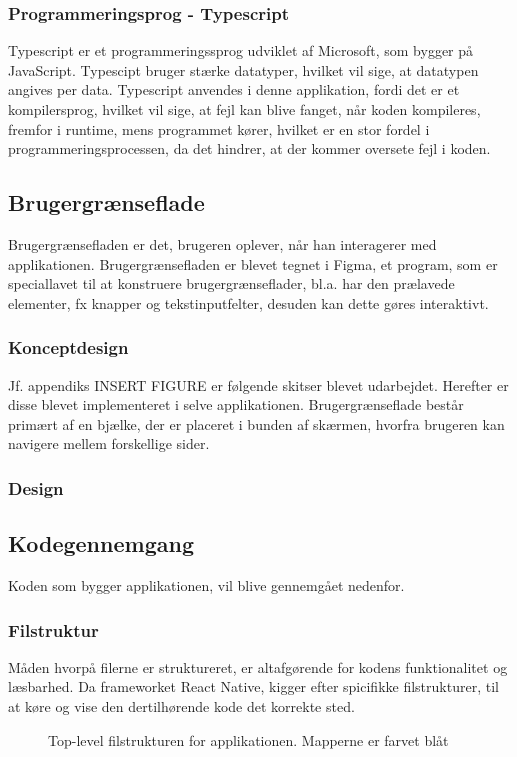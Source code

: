 \subsubsection{Programmeringsprog - Typescript}
Typescript er et programmeringssprog udviklet af Microsoft, som bygger på JavaScript. Typescipt bruger stærke datatyper, hvilket vil sige, at datatypen angives per data. Typescript anvendes i denne applikation, fordi det er et kompilersprog, hvilket vil sige, at fejl kan blive fanget, når koden kompileres, fremfor i runtime, mens programmet kører, hvilket er en stor fordel i programmeringsprocessen, da det hindrer, at der kommer oversete fejl i koden.
\subsection{Brugergrænseflade}
Brugergrænsefladen er det, brugeren oplever, når han interagerer med applikationen. Brugergrænsefladen er blevet tegnet i Figma, et program, som er speciallavet til at konstruere brugergrænseflader, bl.a. har den prælavede elementer, fx knapper og tekstinputfelter, desuden kan dette gøres interaktivt. 
\subsubsection{Konceptdesign}
Jf. appendiks INSERT FIGURE er følgende skitser blevet udarbejdet. Herefter er disse blevet implementeret i selve applikationen. Brugergrænseflade består primært af en bjælke, der er placeret i bunden af skærmen, hvorfra brugeren kan navigere mellem forskellige sider.
\subsubsection{Design}

\subsection{Kodegennemgang}
Koden som bygger applikationen, vil blive gennemgået nedenfor.
\subsubsection{Filstruktur}

Måden hvorpå filerne er struktureret, er altafgørende for kodens funktionalitet og læsbarhed. Da frameworket React Native, kigger efter spicifikke filstrukturer, til at køre og vise den dertilhørende kode det korrekte sted.
\begin{figure}[H]
    \caption{Top-level filstrukturen for applikationen. Mapperne er farvet blåt}
    \label{fig:tlprojstruct}
\end{figure}


